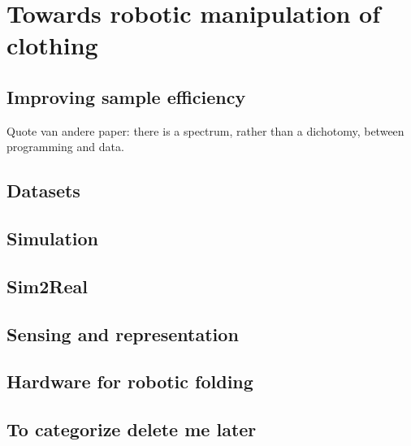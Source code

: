 \documentclass[\home/main.tex]{subfiles}
\begin{document}
\chapter{Towards robotic manipulation of clothing}\label{ch:towards_robotic_folding}


\section{Improving sample efficiency}



Quote van andere paper: there is a spectrum, rather than a dichotomy, between programming and data.

\section{Datasets}

\section{Simulation}

\section{Sim2Real}

\section{Sensing and representation}

\section{Hardware for robotic folding}

\section{To categorize delete me later}
\end{document}
